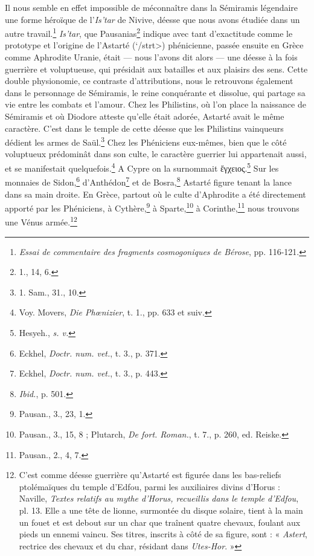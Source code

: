 \documentclass[a4paper, 11pt, oneside]{article}
\begin{document}
Il nous semble en effet impossible de méconnaître dans la Sémiramis légendaire une forme héroïque de l'\emph{Is'tar} de Nivive, déesse que nous avons étudiée dans un autre travail.\footnote{\emph{Essai de commentaire des fragments cosmogoniques de Bérose}, pp. 116-121.} \emph{Is'tar}, que Pausanias\footnote{1., 14, 6.} indique avec tant d'exactitude comme le prototype et l'origine de l'Astarté (\<`/strt>) phénicienne, passée ensuite en Grèce comme Aphrodite Uranie, était --- nous l'avons dit alors --- une déesse à la fois guerrière et voluptueuse, qui présidait aux batailles et aux plaisirs des sens. Cette double physionomie, ce contraste d'attributions, nous le retrouvons également dans le personnage de Sémiramis, le reine conquérante et dissolue, qui partage sa vie entre les combats et l'amour. Chez les Philistins, où l'on place la naissance de Sémiramis et où Diodore atteste qu'elle était adorée, Astarté avait le même caractère. C'est dans le temple de cette déesse que les Philistins vainqueurs dédient les armes de Saül.\footnote{1. Sam., 31., 10.} Chez les Phéniciens eux-mêmes, bien que le côté voluptueux prédominât dans son culte, le caractère guerrier lui appartenait aussi, et se manifestait quelquefois.\footnote{Voy. Movers, \emph{Die Phœnizier}, t. 1., pp. 633 et suiv.} A Cypre on la surnommait ἔγχειος.\footnote{Hesyeh., \emph{s. v.}} Sur les monnaies de Sidon,\footnote{Eckhel, \emph{Doctr. num. vet.}, t. 3., p. 371.} d'Anthédon\footnote{Eckhel, \emph{Doctr. num. vet.}, t. 3., p. 443.} et de Bosra,\footnote{\emph{Ibid.}, p. 501.} Astarté figure tenant la lance dans sa main droite. En Grèce, partout où le culte d'Aphrodite a été directement apporté par les Phéniciens, à Cythère,\footnote{Pausan., 3., 23, 1.} à Sparte,\footnote{Pausan., 3., 15, 8 ; Plutarch, \emph{De fort. Roman.}, t. 7., p. 260, ed. Reiske.} à Corinthe,\footnote{Pausan., 2., 4, 7.} nous trouvons une Vénus armée.\footnote{C'est comme déesse guerrière qu'Astarté est figurée dans les bas-reliefs ptolémaïques du temple d'Edfou, parmi les auxiliaires divins d'Horus : Naville, \emph{Textes relatifs au mythe d'Horus, recueillis dans le temple d'Edfou}, pl. 13. Elle a une tête de lionne, surmontée du disque solaire, tient à la main un fouet et est debout sur un char que traînent quatre chevaux, foulant aux pieds un ennemi vaincu. Ses titres, inscrits à côté de sa figure, sont : « \emph{Astert}, rectrice des chevaux et du char, résidant dans \emph{Utes-Hor}. »}
\end{document}
